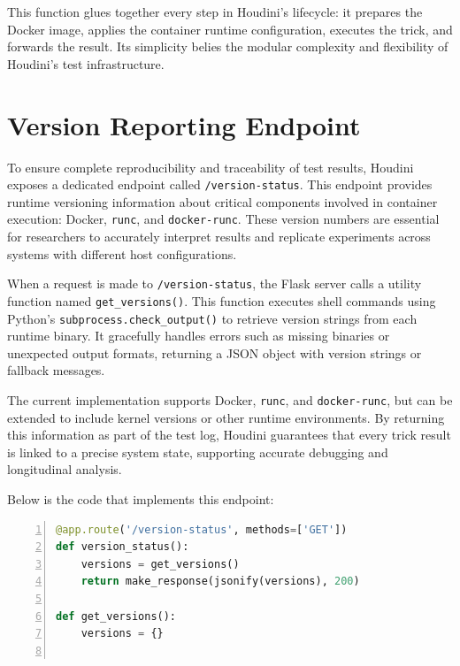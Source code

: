 \documentclass[12pt]{report}
\begin{document}
\begin{doublespace}
This function glues together every step in Houdini's lifecycle: it prepares the Docker image, applies the container runtime configuration, executes the trick, and forwards the result. Its simplicity belies the modular complexity and flexibility of Houdini’s test infrastructure.


\section{Version Reporting Endpoint}

To ensure complete reproducibility and traceability of test results, Houdini exposes a dedicated endpoint called \texttt{/version-status}. This endpoint provides runtime versioning information about critical components involved in container execution: Docker, \texttt{runc}, and \texttt{docker-runc}. These version numbers are essential for researchers to accurately interpret results and replicate experiments across systems with different host configurations.

When a request is made to \texttt{/version-status}, the Flask server calls a utility function named \texttt{get\_versions()}. This function executes shell commands using Python's \texttt{subprocess.check\_output()} to retrieve version strings from each runtime binary. It gracefully handles errors such as missing binaries or unexpected output formats, returning a JSON object with version strings or fallback messages.

The current implementation supports Docker, \texttt{runc}, and \texttt{docker-runc}, but can be extended to include kernel versions or other runtime environments. By returning this information as part of the test log, Houdini guarantees that every trick result is linked to a precise system state, supporting accurate debugging and longitudinal analysis.

Below is the code that implements this endpoint:

\begin{lstlisting}[language=python, caption={Version reporting logic for /version-status}, label={lst:version-status}, numbers=left, numberstyle=\tiny, stepnumber=1, breaklines=true, frame=single, backgroundcolor=\color{gray!10}, basicstyle=\ttfamily\footnotesize, showspaces=false, showstringspaces=false]
@app.route('/version-status', methods=['GET'])
def version_status():
    versions = get_versions()
    return make_response(jsonify(versions), 200)

def get_versions():
    versions = {}


\end{lstlisting}
\end{doublespace}
\end{document}
